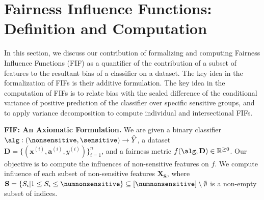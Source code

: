 \section{Fairness Influence Functions: Definition and Computation}\label{sec:fifs}
In this section, we discuss our contribution of formalizing and computing Fairness Influence Functions (FIF) as a quantifier of the contribution of a subset of features to the resultant bias of a classifier on a dataset. The key idea in the formalization of FIFs is their additive formulation. The key idea in the computation of FIFs is to relate bias with the scaled difference of the conditional variance of positive prediction of the classifier over specific sensitive groups, and to apply variance decomposition to compute individual and intersectional FIFs. %

\textbf{FIF: An Axiomatic Formulation.} We are given a binary classifier  $\alg: (\nonsensitive, \sensitive) \rightarrow \widehat{Y} $, a dataset $ \mathbf{D} = \{(\mathbf{x}^{(i)}, \mathbf{a}^{(i)}, y^{(i)})\}_{i=1}^n $, and a  fairness metric $ f(\alg, \mathbf{D}) \in \mathbb{R}^{\geq 0} $. Our objective is to compute the influences of non-sensitive features on $ f $. We compute influence of each subset of non-sensitive features $ \mathbf{X}_{\mathbf{S}} $, where $ \mathbf{S} = \{S_i | 1 \le S_i \le \numnonsensitive\} \subseteq [\numnonsensitive] \setminus \emptyset $ is a non-empty subset of indices. 


